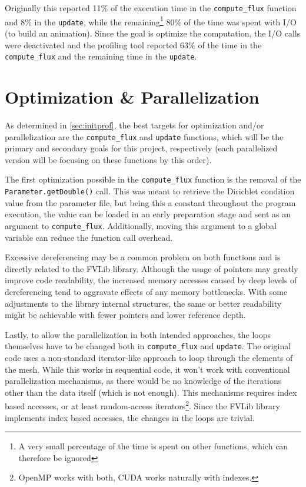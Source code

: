 \documentclass[9pt,twocolumn]{scrartcl}
\begin{document}
Originally this reported 11\% of the execution time in the \texttt{compute\_flux} function and 8\% in the \texttt{update}, while the remaining\footnote{A very small percentage of the time is spent on other functions, which can therefore be ignored} 80\% of the time was spent with I/O (to build an animation). Since the goal is optimize the computation, the I/O calls were deactivated and the profiling tool reported 63\% of the time in the \texttt{compute\_flux} and the remaining time in the \texttt{update}.

\section{Optimization \& Parallelization}
\label{sec:optm&para}
As determined in \autoref{sec:initprof}, the best targets for optimization and/or parallelization are the \texttt{compute\_flux} and \texttt{update} functions, which will be the primary and secondary goals for this project, respectively (each parallelized version will be focusing on these functions by this order).

The first optimization possible in the \texttt{compute\_flux} function is the removal of the \texttt{Parameter.getDouble()} call. This was meant to retrieve the Dirichlet condition value from the parameter file, but being this a constant throughout the program execution, the value can be loaded in an early preparation stage and sent as an argument to \texttt{compute\_flux}. Additionally, moving this argument to a global variable can reduce the function call overhead.

Excessive dereferencing may be a common problem on both functions and is directly related to the FVLib library. Although the usage of pointers may greatly improve code readability, the increased memory accesses caused by deep levels of dereferencing tend to aggravate effects of any memory bottlenecks. With some adjustments to the library internal structures, the same or better readability might be achievable with fewer pointers and lower reference depth.

Lastly, to allow the parallelization in both intended approaches, the loops themselves have to be changed both in \texttt{compute\_flux} and \texttt{update}. The original code uses a non-standard iterator-like approach to loop through the elements of the mesh. While this works in sequential code, it won't work with conventional parallelization mechanisms, as there would be no knowledge of the iterations other than the data itself (which is not enough). This mechanisms requires index based accesses, or at least random-access iterators\footnote{OpenMP works with both, CUDA works naturally with indexes.}. Since the FVLib library implements index based accesses, the changes in the loops are trivial.
\end{document}
